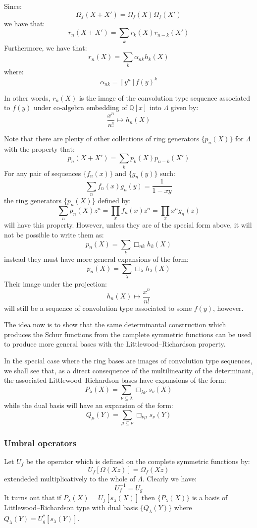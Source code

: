 \documentclass[12pt,dvips]{amsart}
\begin{document}
\par\bigskip
Since:
$$ \Omega_{f}(X + X') = \Omega_{f}(X)\Omega_{f}(X') $$
we have that:
$$ r_n(X + X') = \sum_k r_k(X) r_{n-k}(X')$$
Furthermore, we have that:
$$ r_n(X) = \sum_k \alpha_{nk} h_k(X) $$
where:
$$ \alpha_{nk} = [y^n]f(y)^k $$

\par\bigskip
In other words, $r_n(X)$ is the image of the convolution type sequence associated to $f(y)$ under co-algebra embedding of $\mathbb{Q}[x]$ into $\Lambda$ given by:
$$ \frac{x^n}{n!} \mapsto h_n(X) $$

\noindent
Note that there are plenty of other collections of ring generators $\{p_n(X)\}$ for $\Lambda$ with the property that:
$$ p_n(X + X') = \sum_k p_k(X) p_{n-k}(X') $$
For any pair of sequences $\{f_n(x)\}$ and $\{g_n(y)\}$ such:
$$ \sum_n f_n(x) g_n(y) = \frac{1}{1-xy} $$
the ring generators $\{p_n(X)\}$ defined by:
$$ \sum_n p_n(X)z^n = \prod_x f_n(x) z^n = \prod_x x^n g_n(z) $$
will have this property. However, unless they are of the special form above, it will not be possible to write them as:
$$ p_n(X) = \sum_k \Box_{nk} h_k(X) $$
instead they must have more general expansions of the form:
$$ p_n(X) = \sum_{\lambda} \Box_{\lambda} h_\lambda(X) $$
Their image under the projection: 
$$h_n(X) \mapsto \frac{x^n}{n!}$$ 
will still be a sequence of convolution type associated to some $f(y)$, however.

\par\bigskip

The idea now is to show that the same determinantal construction which produces the Schur functions from the complete symmetric functions can be used to produce more general bases with the Littlewood--Richardson property. 

In the special case where the ring bases are images of convolution type sequences, we shall see that, as a direct consequence of the multilinearity of the determinant, the associated Littlewood--Richardson bases have expansions of the form:
$$ P_\lambda(X) = \sum_{\nu \subseteq \lambda} \Box_{\lambda \nu} s_\nu(X) $$
while the dual basis will have an expansion of the form:
$$ Q_\mu(Y) = \sum_{\mu \subseteq \nu} \Box_{\nu \mu} s_\nu(Y) $$



\subsubsection{Umbral operators}
Let $U_f$ be the operator which is defined on the complete symmetric functions by:
$$ U_f[\Omega(Xz)] = \Omega_{f}(Xz)$$
extendeded multiplicatively to the whole of $\Lambda$.
Clearly we have:
$$ U_f^{-1} = U_g $$
It turns out that if $P_\lambda(X) = U_f[s_\lambda(X)]$ then $\{P_\lambda(X)\}$ is a basis of Littlewood--Richardson type with dual basis $\{Q_\lambda(Y)\}$ where $Q_\lambda(Y) = U_g^*[s_\lambda(Y)]$. 
\end{document}
